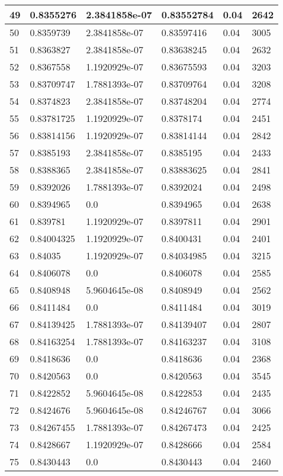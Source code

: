 \begin{longtable}{|l|l|l|l|l|l|}
49 & 0.8355276 & 2.3841858e-07 & 0.83552784 & 0.04 & 2642 \\ \hline 
50 & 0.8359739 & 2.3841858e-07 & 0.83597416 & 0.04 & 3005 \\ \hline 
51 & 0.8363827 & 2.3841858e-07 & 0.83638245 & 0.04 & 2632 \\ \hline 
52 & 0.8367558 & 1.1920929e-07 & 0.83675593 & 0.04 & 3203 \\ \hline 
53 & 0.83709747 & 1.7881393e-07 & 0.83709764 & 0.04 & 3208 \\ \hline 
54 & 0.8374823 & 2.3841858e-07 & 0.83748204 & 0.04 & 2774 \\ \hline 
55 & 0.83781725 & 1.1920929e-07 & 0.8378174 & 0.04 & 2451 \\ \hline 
56 & 0.83814156 & 1.1920929e-07 & 0.83814144 & 0.04 & 2842 \\ \hline 
57 & 0.8385193 & 2.3841858e-07 & 0.8385195 & 0.04 & 2433 \\ \hline 
58 & 0.8388365 & 2.3841858e-07 & 0.83883625 & 0.04 & 2841 \\ \hline 
59 & 0.8392026 & 1.7881393e-07 & 0.8392024 & 0.04 & 2498 \\ \hline 
60 & 0.8394965 & 0.0 & 0.8394965 & 0.04 & 2638 \\ \hline 
61 & 0.839781 & 1.1920929e-07 & 0.8397811 & 0.04 & 2901 \\ \hline 
62 & 0.84004325 & 1.1920929e-07 & 0.8400431 & 0.04 & 2401 \\ \hline 
63 & 0.84035 & 1.1920929e-07 & 0.84034985 & 0.04 & 3215 \\ \hline 
64 & 0.8406078 & 0.0 & 0.8406078 & 0.04 & 2585 \\ \hline 
65 & 0.8408948 & 5.9604645e-08 & 0.8408949 & 0.04 & 2562 \\ \hline 
66 & 0.8411484 & 0.0 & 0.8411484 & 0.04 & 3019 \\ \hline 
67 & 0.84139425 & 1.7881393e-07 & 0.84139407 & 0.04 & 2807 \\ \hline 
68 & 0.84163254 & 1.7881393e-07 & 0.84163237 & 0.04 & 3108 \\ \hline 
69 & 0.8418636 & 0.0 & 0.8418636 & 0.04 & 2368 \\ \hline 
70 & 0.8420563 & 0.0 & 0.8420563 & 0.04 & 3545 \\ \hline 
71 & 0.8422852 & 5.9604645e-08 & 0.8422853 & 0.04 & 2435 \\ \hline 
72 & 0.8424676 & 5.9604645e-08 & 0.84246767 & 0.04 & 3066 \\ \hline 
73 & 0.84267455 & 1.7881393e-07 & 0.84267473 & 0.04 & 2425 \\ \hline 
74 & 0.8428667 & 1.1920929e-07 & 0.8428666 & 0.04 & 2584 \\ \hline 
75 & 0.8430443 & 0.0 & 0.8430443 & 0.04 & 2460 \\ \hline 
\end{longtable}
